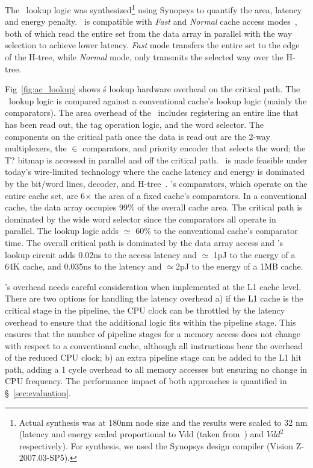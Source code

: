 

The \AC\ lookup logic was synthesized\footnote{Actual synthesis was at 180nm node size and the results were scaled to 32 nm (latency and energy scaled proportional to Vdd (taken from~\cite{Danowitz:2012:CDR:2133806.2133822}) and $Vdd^2$ respectively). For synthesis, we used the Synopsys design compiler (Vision Z-2007.03-SP5).} using Synopsys to quantify the area, latency and energy penalty. \AC\ is compatible with  \textit{Fast} and \textit{Normal} cache access modes~\cite{Muralimanohar:2007:ONO:1331699.1331704}, both of which read the entire set from the data array in parallel with the way selection to  achieve lower latency. \textit{Fast} mode transfers the entire set to the edge of the H-tree, while \textit{Normal} mode, only transmits the selected way over the H-tree. 

Fig~\ref{fig:ac_lookup} shows \AC\'s lookup hardware overhead on the critical path. The \AC\ lookup logic is compared against a conventional cache's lookup logic (mainly the comparators). The area overhead of the \AC\ includes registering an entire line that has been read out, the tag operation logic, and the word selector. The components on the critical path once the data is read out are the 2-way multiplexers, the $\in$ comparators, and priority encoder that selects the word; the T?  bitmap is accessed in parallel and off the critical path. \AC\ is made feasible under today's wire-limited technology where the cache latency and energy is dominated by the bit/word lines, decoder, and H-tree~\cite{Muralimanohar:2007:ONO:1331699.1331704}. \AC{}'s comparators, which operate on the entire cache set, are 6$\times$ the area of a fixed cache's comparators. In a conventional cache, the data array occupies 99\% of the overall cache area. The critical path is dominated by the wide word selector since the comparators all operate in parallel. The lookup logic adds $\simeq$ 60\% to the conventional cache's comparator time. The overall critical path is dominated by the data array access and \AC{}'s lookup circuit adds 0.02ns to the access latency and $\simeq$ 1pJ to the energy of a 64K cache, and 0.035ns to the latency and $\simeq$2pJ to the energy of a 1MB cache. 

\AC{}'s overhead needs careful consideration when implemented at the L1 cache level. There are two options for handling the latency overhead a) if the L1 cache is the critical stage in the pipeline, the CPU clock can be throttled by the latency overhead to ensure that the additional logic fits within the pipeline stage. This ensures that the number of pipeline stages for a memory access does not change with respect to a conventional cache, although all instructions bear the overhead of the reduced CPU clock; b) an extra pipeline stage can be added to the L1 hit path, adding a 1 cycle overhead to all memory accesses but ensuring no change in CPU frequency. The performance impact of both approaches is quantified in \S~\ref{sec:evaluation}.


